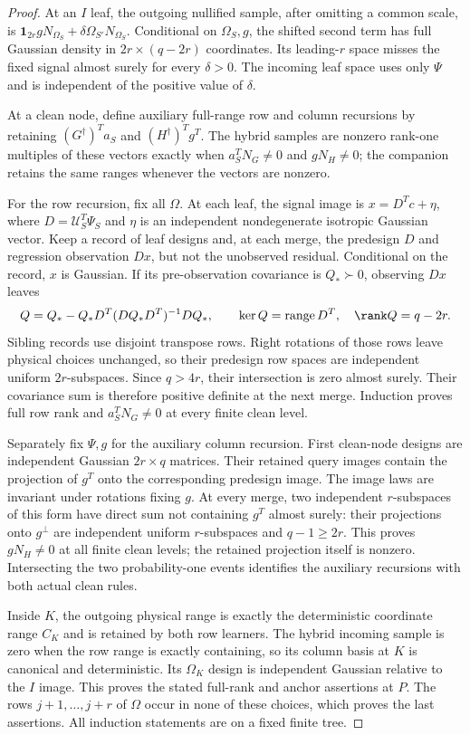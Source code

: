 \documentclass[11pt,oneside,openany,a4paper]{book}
\numberwithin{equation}{chapter}
\theoremstyle{definition}
\theoremstyle{remark}
\DeclareMathOperator{\ran}{range}\DeclareMathOperator{\OPT}{OPT}
\begin{document}
\begin{proof}
At an $I$ leaf, the outgoing nullified sample, after omitting a common scale, is $\mathbf1_{2r}gN_{\Omega_S}+\delta\Omega_{S'}N_{\Omega_S}$. Conditional on $\Omega_S,g$, the shifted second term has full Gaussian density in $2r\times(q-2r)$ coordinates. Its leading-$r$ space misses the fixed signal almost surely for every $\delta>0$. The incoming leaf space uses only $\Psi$ and is independent of the positive value of $\delta$.

At a clean node, define auxiliary full-range row and column recursions by retaining $(G^\dagger)^Ta_S$ and $(H^\dagger)^Tg^T$. The hybrid samples are nonzero rank-one multiples of these vectors exactly when $a_S^TN_G\ne0$ and $gN_H\ne0$; the companion retains the same ranges whenever the vectors are nonzero.

For the row recursion, fix all $\Omega$. At each leaf, the signal image is $x=D^Tc+\eta$, where $D=\mathcal U_S^T\Psi_S$ and $\eta$ is an independent nondegenerate isotropic Gaussian vector. Keep a record of leaf designs and, at each merge, the predesign $D$ and regression observation $Dx$, but not the unobserved residual. Conditional on the record, $x$ is Gaussian. If its pre-observation covariance is $Q_*\succ0$, observing $Dx$ leaves
\[
 Q=Q_*-Q_*D^T(DQ_*D^T)^{-1}DQ_*,\qquad
 \ker Q=\ran D^T,\quad \rank Q=q-2r.
\]
Sibling records use disjoint transpose rows. Right rotations of those rows leave physical choices unchanged, so their predesign row spaces are independent uniform $2r$-subspaces. Since $q>4r$, their intersection is zero almost surely. Their covariance sum is therefore positive definite at the next merge. Induction proves full row rank and $a_S^TN_G\ne0$ at every finite clean level.

Separately fix $\Psi,g$ for the auxiliary column recursion. First clean-node designs are independent Gaussian $2r\times q$ matrices. Their retained query images contain the projection of $g^T$ onto the corresponding predesign image. The image laws are invariant under rotations fixing $g$. At every merge, two independent $r$-subspaces of this form have direct sum not containing $g^T$ almost surely: their projections onto $g^\perp$ are independent uniform $r$-subspaces and $q-1\ge2r$. This proves $gN_H\ne0$ at all finite clean levels; the retained projection itself is nonzero. Intersecting the two probability-one events identifies the auxiliary recursions with both actual clean rules.

Inside $K$, the outgoing physical range is exactly the deterministic coordinate range $C_K$ and is retained by both row learners. The hybrid incoming sample is zero when the row range is exactly containing, so its column basis at $K$ is canonical and deterministic. Its $\Omega_K$ design is independent Gaussian relative to the $I$ image. This proves the stated full-rank and anchor assertions at $P$. The rows $j+1,\ldots,j+r$ of $\Omega$ occur in none of these choices, which proves the last assertions. All induction statements are on a fixed finite tree.
\end{proof}
\end{document}
